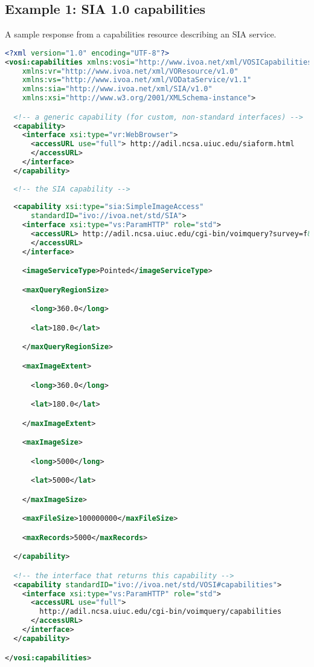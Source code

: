 \documentclass[11pt,letter]{ivoa}
\begin{document}
\subsection{Example 1: SIA 1.0 capabilities}

A sample response from a capabilities resource describing an SIA service. 

\begin{lstlisting}[language=XML,basicstyle=\footnotesize]
<?xml version="1.0" encoding="UTF-8"?>
<vosi:capabilities xmlns:vosi="http://www.ivoa.net/xml/VOSICapabilities/v1.0"
    xmlns:vr="http://www.ivoa.net/xml/VOResource/v1.0"
    xmlns:vs="http://www.ivoa.net/xml/VODataService/v1.1"
    xmlns:sia="http://www.ivoa.net/xml/SIA/v1.0"
    xmlns:xsi="http://www.w3.org/2001/XMLSchema-instance">

  <!-- a generic capability (for custom, non-standard interfaces) -->
  <capability>
    <interface xsi:type="vr:WebBrowser">
      <accessURL use="full"> http://adil.ncsa.uiuc.edu/siaform.html 
      </accessURL>
    </interface>
  </capability>
  
  <!-- the SIA capability -->
 
  <capability xsi:type="sia:SimpleImageAccess" 
      standardID="ivo://ivoa.net/std/SIA">
    <interface xsi:type="vs:ParamHTTP" role="std">
      <accessURL> http://adil.ncsa.uiuc.edu/cgi-bin/voimquery?survey=f&amp; 
      </accessURL>
    </interface>

    <imageServiceType>Pointed</imageServiceType>

    <maxQueryRegionSize>

      <long>360.0</long>

      <lat>180.0</lat>

    </maxQueryRegionSize>

    <maxImageExtent>

      <long>360.0</long>

      <lat>180.0</lat>

    </maxImageExtent>

    <maxImageSize>

      <long>5000</long>

      <lat>5000</lat>

    </maxImageSize>

    <maxFileSize>100000000</maxFileSize>

    <maxRecords>5000</maxRecords>

  </capability>

  <!-- the interface that returns this capability -->
  <capability standardID="ivo://ivoa.net/std/VOSI#capabilities">
    <interface xsi:type="vs:ParamHTTP" role="std">
      <accessURL use="full"> 
        http://adil.ncsa.uiuc.edu/cgi-bin/voimquery/capabilities 
      </accessURL>
    </interface>
  </capability>

</vosi:capabilities>
\end{lstlisting}
\end{document}

